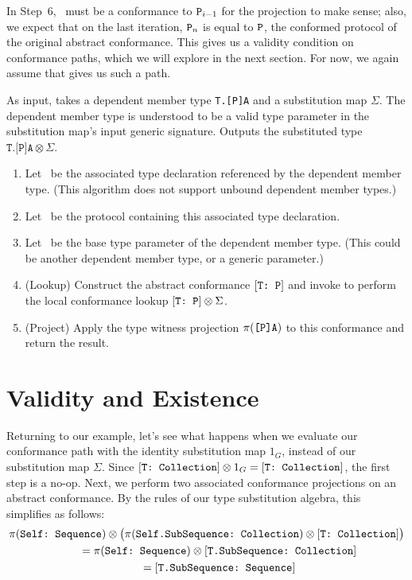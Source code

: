 \documentclass[../generics]{subfiles}
\begin{document}
In Step~6, \nC\ must be a conformance to $\texttt{P}_{i-1}$ for the projection to make sense; also, we expect that on the last iteration, $\texttt{P}_n$ is equal to $\texttt{P}$, the conformed protocol of the original abstract conformance. This gives us a validity condition on conformance paths, which we will explore in the next section. For now, we again assume that  gives us such a path.
\begin{algorithm}\label{dependent member type substitution}
As input, takes a dependent member type \texttt{T.[P]A} and a substitution map $\Sigma$. The dependent member type is understood to be a valid type parameter in the substitution map's input generic signature. Outputs the substituted type $\texttt{T.[P]A}\otimes\Sigma$.
\begin{enumerate}
\item Let \nA\ be the associated type declaration referenced by the dependent member type. (This algorithm does not support unbound dependent member types.)
\item Let \tP\ be the protocol containing this associated type declaration.
\item Let \tT\ be the base type parameter of the dependent member type. (This could be another dependent member type, or a generic parameter.)
\item (Lookup) Construct the abstract conformance $[\texttt{T:~P}]$ and invoke  to perform the local conformance lookup $[\texttt{T:~P}]\otimes\Sigma$.
\item (Project) Apply the type witness projection $\pi(\texttt{[P]A})$ to this conformance and return the result.
\end{enumerate}
\end{algorithm}

\section{Validity and Existence}\label{conformance paths exist}

Returning to our example, let's see what happens when we evaluate our conformance path with the identity substitution map $1_G$, instead of our substitution map $\Sigma$. Since $[\texttt{T:~Collection}]\otimes 1_G=[\texttt{T:~Collection}]$, the first step is a no-op. Next, we perform two associated conformance projections on an abstract conformance. By the rules of our type substitution algebra, this simplifies as follows:
\begin{gather*}
\pi(\texttt{Self:~Sequence}) \otimes \bigl(\pi(\texttt{Self.SubSequence:~Collection}) \otimes [\texttt{T:~Collection}]\bigr)\\
\qquad {} = \pi(\texttt{Self:~Sequence}) \otimes [\texttt{T.SubSequence:~Collection}]\\
\qquad {} = [\texttt{T.SubSequence:~Sequence}]
\end{gather*}
\end{document}
